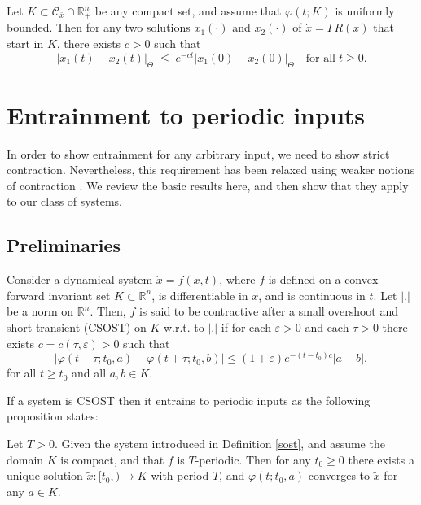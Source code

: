 \documentclass[onefignum,onetabnum]{siamonline220329}
\newcommand\bx{{\bar x}}
\newcommand{\Cs}{\mathscr C}
\def\infty{}%
\begin{document}
{\begin{theorem}
	
	Let $K\subset \Cs_\bx \cap \mathbb R_+^n$ be any compact set, and assume that $\varphi(t;K)$ is uniformly bounded. Then
	for any two solutions $x_1(\cdot)$ and $x_2(\cdot)$ of $\dot x=\Gamma R(x)$ that start in $K$, there exists   $c>0$ such that
	\[
	|x_1(t)-x_2(t)|_{\Theta} \;\leq\; e^{-ct}|x_1(0)-x_2(0)|_{\Theta} \quad \mbox{for all}\; t\geq0.
	\]
\end{theorem}



\section{Entrainment to periodic inputs}
In order to show entrainment for any arbitrary input, we need to show strict contraction. Nevertheless, this requirement has been relaxed using weaker notions of contraction \cite{margaliot16}. We review the basic results here, and then show that they apply to our class of systems. 

\subsection{Preliminaries}

\begin{definition}\label{sost} Consider a dynamical system $\dot x=f({x,t})$, where $f$ is defined on {a} convex forward invariant set $K\subset {\mathbb R}^n$, is differentiable in $x$, and is continuous in $t$. Let $|.|$ be a norm on $\mathbb R^n$. Then, $f$ is said to be contractive after a small overshoot and short transient (CSOST) on $K$ w.r.t. to $|.|$ if for each $\varepsilon>0$ and each $\tau>0$ there exists $c=c(\tau,\varepsilon)>{0}$ such that 
	\[ |\varphi(t+\tau;t_0,a)-\varphi(t+\tau;t_0,{b})| \le (1+\varepsilon) e^{-(t-t_0)c} |a-b|, \]
	for all $t\ge t_0$ and all $a,b \in K$. 
\end{definition} 
If a system is  CSOST then it entrains to periodic inputs as the following proposition states:

\begin{proposition}  \label{pr.entrainment}Let $T>0$. Given the system introduced in Definition \ref{sost}, and assume the domain $K$ is compact, and that $f$ is $T$-periodic. Then for any $t_0\ge0$ there exists a unique solution $\tilde x:[t_0,\infty)\to K$ with period $T$, and $\varphi(t;t_0,a)$ converges to $\tilde x$ for any $a\in K$. 
\end{proposition}

}
\end{document}
